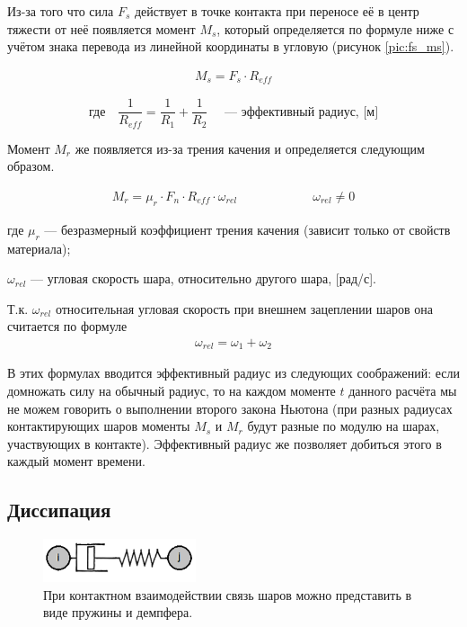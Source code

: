 \documentclass[a4paper]{article}
\begin{document}
Из-за того что сила $F_s$ действует в точке контакта при переносе её в центр тяжести от неё появляется момент $M_s$, который определяется по формуле ниже с учётом знака перевода из линейной координаты в угловую (рисунок \ref{pic:fs_ms}).

\begin{align}
\label{sliding_moment}
M_s = F_s \cdot R_{eff}
\end{align}

\[
\text{где} \quad \dfrac{1}{R_{eff}} = \dfrac{1}{R_1} + \dfrac{1}{R_2} \quad \text{ --- эффективный радиус, [м]}
\]

Момент $M_r$ же появляется из-за трения качения и определяется следующим образом.

\begin{align}
\label{rolling_moment}
M_r = \mu_r \cdot F_n \cdot R_{eff} \cdot \omega_{rel} \qquad \qquad \qquad \omega_{rel} \neq 0
\end{align}

где $\mu_r$ --- безразмерный коэффициент трения качения (зависит только от свойств материала);

$\omega_{rel}$ --- угловая скорость шара, относительно другого шара, [рад/с].

Т.к. $\omega_{rel}$ относительная угловая скорость при внешнем зацеплении шаров она считается по формуле 
\begin{align}
\label{omega_rel}
\omega_{rel} = \omega_1 + \omega_2
\end{align}

В этих формулах вводится эффективный радиус из следующих соображений: если домножать силу на обычный радиус, то на каждом моменте $t$ данного расчёта мы не можем говорить о выполнении второго закона Ньютона (при разных радиусах контактирующих шаров моменты $M_s$ и $M_r$ будут разные по модулю на шарах, участвующих в контакте).
Эффективный радиус же позволяет добиться этого в каждый момент времени.


\subsection{Диссипация}
\label{dempf_subsection}

\begin{figure}[H]
	\centering
	\includegraphics[width=0.4\textwidth]{dempf}
	\caption{При контактном взаимодействии связь шаров можно представить в виде пружины и демпфера.}
	\label{pic:dempf}
\end{figure} 
\end{document}
